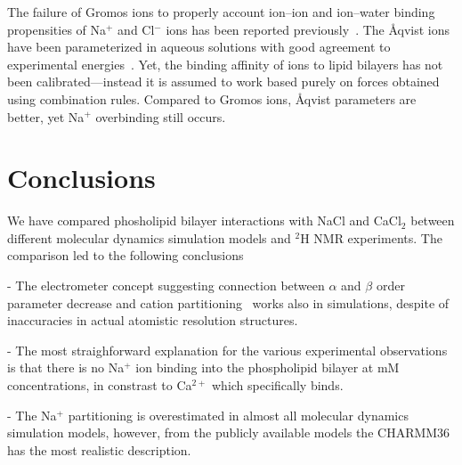 \documentclass[pre,aps,floatfix,authordate1-4,twocolumn]{revtex4-1}
\begin{document}
The failure
 of Gromos ions to properly account ion--ion and ion--water binding propensities of Na$^+$ and Cl$^-$ ions has been
 reported previously~\cite{Reif13}. The \r{A}qvist ions have been parameterized in aqueous solutions with good agreement
 to experimental energies~\cite{Aaqvist90}. Yet, the binding affinity of ions to lipid bilayers has not been
 calibrated---instead it is assumed to work based purely on forces obtained using combination rules. Compared to Gromos
 ions, \r{A}qvist parameters are better, yet Na$^+$ overbinding still occurs.




\section{Conclusions}
We have compared phosholipid bilayer interactions with NaCl and CaCl$_2$ between different molecular dynamics simulation
models and $^2$H NMR experiments. The comparison led to the following conclusions

- The electrometer concept suggesting connection between $\alpha$ and $\beta$ order parameter decrease and
cation partitioning~\cite{akutsu81,altenbach84,seelig87,scherer89} works also in simulations, despite of inaccuracies in actual atomistic resolution structures. 

- The most straighforward explanation for the various experimental observations is that there is no Na$^+$ ion binding
into the phospholipid bilayer at mM concentrations, in constrast to Ca$^{2+}$ which specifically binds.

- The Na$^+$ partitioning is overestimated in almost all molecular dynamics simulation models, however, from the publicly available models the CHARMM36 has the most realistic description.
\end{document}
